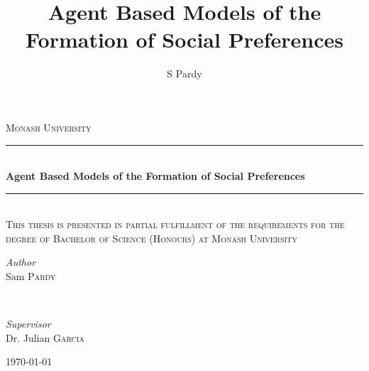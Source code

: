 \documentclass[11pt]{book}
\title{Agent Based Models of the Formation of Social Preferences}
\author{S Pardy}
\begin{document}
\begin{titlepage}
	\newcommand{\HRule}{\rule{\linewidth}{0.5mm}} %
	
	\center %

	\textsc{\LARGE Monash University}\\[1.5cm]	

	
	\HRule\\[0.4cm]
	
	{\huge\bfseries Agent Based Models of the Formation of Social Preferences}\\[0.4cm]
	
	\HRule\\[1.5cm]
	
	
	
	\textsc{\large This thesis is presented in partial fulfillment of the requirements for the degree of Bachelor of Science (Honours) at Monash University}\\[0.5cm] %
	
	\vfill
	\vfill
	
	\begin{minipage}{0.4\textwidth}
		\begin{flushleft}
			\large
			\textit{Author}\\
			Sam \textsc{Pardy}
		\end{flushleft}
	\end{minipage}
	~
	\begin{minipage}{0.4\textwidth}
		\begin{flushright}
			\large 
			\textit{Supervisor}\\
			Dr. Julian \textsc{Garcia}   
		\end{flushright}
	\end{minipage}
	
	
	\vfill\vfill\vfill %
	
	{\large\today} %

	\vfill %
	
\end{titlepage}
\end{document}
